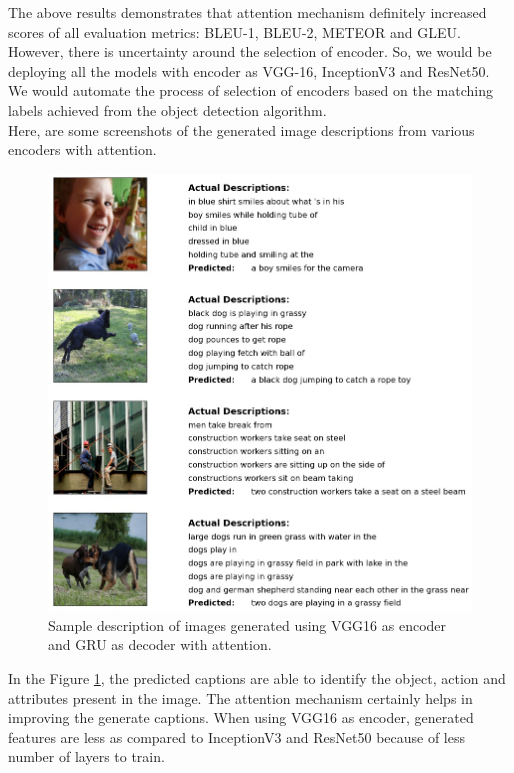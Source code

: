 \newpage
\noindent
The above results demonstrates that attention mechanism definitely increased scores of all evaluation metrics: BLEU-1, BLEU-2, METEOR and GLEU. However, there is uncertainty around the selection of encoder. So, we would be deploying all the models with encoder as VGG-16, InceptionV3 and ResNet50. We would automate the process of selection of encoders based on the matching labels achieved from the object detection algorithm.\\ 
\noindent Here, are some screenshots of the generated image descriptions from various encoders with attention.

\begin{figure}[ht!]
    \includegraphics[scale=0.4]{chapters/5/intfig/vgg16_and_gru_with_attention_output.jpg}
    \caption{Sample description of images generated using VGG16 as encoder and GRU as decoder with attention.}
    \label{res:vgg16_gru_attention}
\end{figure}

\noindent In the Figure \ref{res:vgg16_gru_attention}, the predicted captions are able to identify the object, action and attributes present in the image. The attention mechanism certainly helps in improving the generate captions. When using VGG16 as encoder, generated features are less as compared to InceptionV3 and ResNet50 because of less number of layers to train. \\ \\

